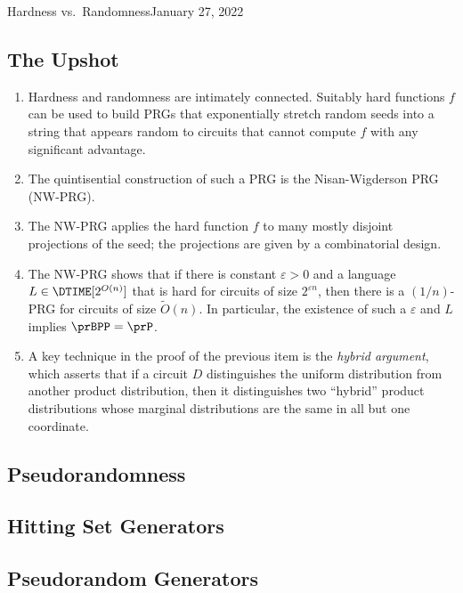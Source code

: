 \begin{lecture}{2}{Hardness vs.\ Randomness}{January 27, 2022}
\label{lec:02}

\subsection*{The Upshot}

\begin{enumerate}
  \item Hardness and randomness are intimately connected. Suitably hard
    functions $f$ can be used to build PRGs that exponentially stretch random
    seeds into a string that appears random to circuits that cannot compute $f$
    with any significant advantage.
  \item The quintisential construction of such a PRG is the Nisan-Wigderson PRG
    (NW-PRG).
  \item The NW-PRG applies the hard function $f$ to many mostly disjoint
    projections of the seed; the projections are given by a combinatorial
    design.
  \item The NW-PRG shows that if there is constant $\varepsilon > 0$ and a
    language $L \in \DTIME[2^{O(n)}]$ that is hard for circuits of size
    $2^{\varepsilon n}$, then there is a $(1/n)$-PRG for circuits of size
    $\widetilde{O}(n)$. In particular, the existence of such a $\varepsilon$ and
    $L$ implies $\prBPP = \prP$.
  \item A key technique in the proof of the previous item is the \emph{hybrid
    argument}, which asserts that if a circuit $D$ distinguishes the uniform
    distribution from another product distribution, then it distinguishes two
    ``hybrid'' product distributions whose marginal distributions are the same
    in all but one coordinate.
\end{enumerate}

\subsection{Pseudorandomness}

\subsection{Hitting Set Generators}

\subsection{Pseudorandom Generators}


\end{lecture}

